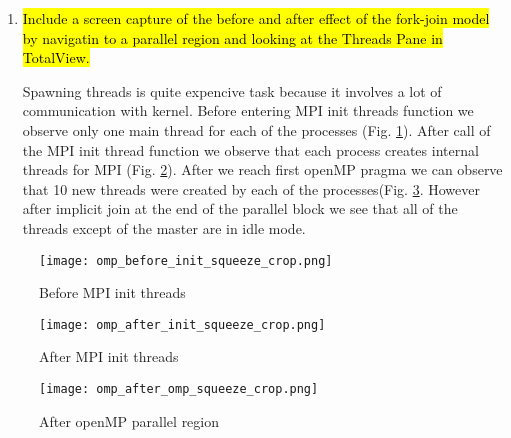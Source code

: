 \documentclass{article}
\begin{document}
\begin{enumerate}
	\item \hl{Include a screen capture of the before and after effect of the fork-join model by navigatin to a parallel region and looking at the Threads Pane in TotalView.} ~
	
	Spawning threads is quite expencive task because it involves a lot of 
	communication with kernel. Before entering MPI init threads function we observe only one 
	main thread for each of the processes (Fig. \ref{fig:before_init_hybrid}).
	After call of the MPI init thread function we observe that each process creates internal threads
	for MPI (Fig. \ref{fig:after_init_hybrid}).
    After we reach first openMP pragma we can observe that 10 new threads were created by each of the 
	processes(Fig. \ref{fig:after_omp_region_hybrid}.
	However after implicit join at the end of the parallel block we see that all of the
	threads except of the master are in idle mode.
	
\end{enumerate}

\begin{figure}
    \begin{center}
        \texttt{[image: omp\_before\_init\_squeeze\_crop.png]}
    \caption{Before MPI init threads}
    \label{fig:before_init_hybrid}
    \end{center}
\end{figure}
\begin{figure}
    \begin{center}
        \texttt{[image: omp\_after\_init\_squeeze\_crop.png]}
    \caption{After MPI init threads}
    \label{fig:after_init_hybrid}
    \end{center}
\end{figure}

\begin{figure}
    \begin{center}
        \texttt{[image: omp\_after\_omp\_squeeze\_crop.png]}
    \caption{After openMP parallel region}
    \label{fig:after_omp_region_hybrid}
    \end{center}
\end{figure}
\end{document}
